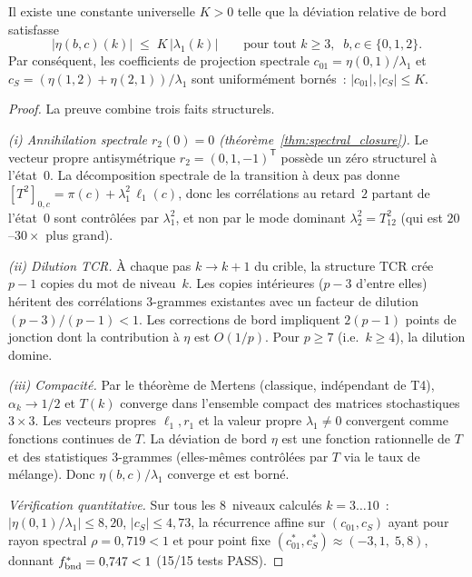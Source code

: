 \documentclass[12pt,a4paper]{article}
\begin{document}
\begin{lemme}
\label{lem:mixing_bound}
Il existe une constante universelle $K > 0$ telle que la déviation
relative de bord satisfasse
\begin{equation}
  |\eta(b,c)(k)| \;\leq\; K\,|\lambda_1(k)|
  \qquad\text{pour tout } k \geq 3,\;\; b,c \in \{0,1,2\}.
  \label{eq:mixing_bound}
\end{equation}
Par conséquent, les coefficients de projection spectrale
$c_{01} = \eta(0,1)/\lambda_1$ et
$c_S = (\eta(1,2)+\eta(2,1))/\lambda_1$ sont uniformément bornés~:
$|c_{01}|, |c_S| \leq K$.

\begin{proof}
La preuve combine trois faits structurels.

\emph{(i) Annihilation spectrale $r_2(0) = 0$
(théorème~\ref{thm:spectral_closure}).}
Le vecteur propre antisymétrique $r_2 = (0,1,-1)^{\mathsf T}$
possède un zéro structurel à l'état~$0$. La décomposition spectrale
de la transition à deux pas donne
$[T^2]_{0,c} = \pi(c) + \lambda_1^2\,\ell_1(c)$,
donc les corrélations au retard~$2$ partant de l'état~$0$ sont
contrôlées par $\lambda_1^2$, et non par le mode dominant
$\lambda_2^2 = T_{12}^2$ (qui est $20$--$30\times$ plus grand).

\emph{(ii) Dilution TCR.}
À chaque pas $k \to k+1$ du crible, la structure TCR crée $p-1$
copies du mot de niveau~$k$. Les copies intérieures ($p-3$ d'entre
elles) héritent des corrélations 3-grammes existantes avec un facteur
de dilution $(p-3)/(p-1) < 1$. Les corrections de bord impliquent
$2(p-1)$ points de jonction dont la contribution à $\eta$ est
$O(1/p)$. Pour $p \geq 7$ (i.e.\ $k \geq 4$), la dilution domine.

\emph{(iii) Compacité.}
Par le théorème de Mertens (classique, indépendant de T4),
$\alpha_k \to 1/2$ et $T(k)$ converge dans l'ensemble compact des
matrices stochastiques $3\times 3$. Les vecteurs propres
$\ell_1, r_1$ et la valeur propre $\lambda_1 \neq 0$ convergent
comme fonctions continues de $T$. La déviation de bord $\eta$ est
une fonction rationnelle de $T$ et des statistiques 3-grammes
(elles-mêmes contrôlées par $T$ via le taux de mélange). Donc
$\eta(b,c)/\lambda_1$ converge et est borné.

\emph{Vérification quantitative.}
Sur tous les 8~niveaux calculés $k = 3\ldots 10$~:
$|\eta(0,1)/\lambda_1| \leq 8{,}20$,
$|c_S| \leq 4{,}73$,
la récurrence affine sur $(c_{01}, c_S)$ ayant pour rayon spectral
$\rho = 0{,}719 < 1$ et pour point fixe
$(c_{01}^*, c_S^*) \approx (-3{,}1,\; 5{,}8)$, donnant
$f_{\rm bnd}^* = 0{,}747 < 1$ (15/15 tests PASS).
\end{proof}
\end{lemme}
\end{document}
